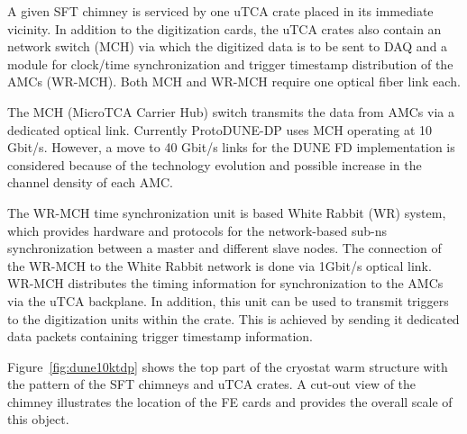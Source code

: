 
A given SFT chimney is serviced by one uTCA crate placed in its immediate vicinity. In addition to the digitization cards, the uTCA crates also contain an network switch (MCH) via which the digitized data is to be sent to DAQ and a module for clock/time synchronization and trigger timestamp distribution of the AMCs (WR-MCH). Both MCH and WR-MCH require one optical fiber link each. 

The MCH (MicroTCA Carrier Hub) switch transmits the data from AMCs via a dedicated optical link. Currently ProtoDUNE-DP uses MCH operating at 10 Gbit/s. However, a move to 40 Gbit/s links for the DUNE FD implementation is considered because of the technology evolution and possible increase in the channel density of each AMC.

The WR-MCH time synchronization unit is based White Rabbit (WR) system, which provides hardware and protocols for the network-based sub-ns synchronization between a master and different slave nodes. The connection of the WR-MCH to the White Rabbit network is done via \num{1}\si{Gbit/s} optical link. WR-MCH distributes the timing information for synchronization to the AMCs via the uTCA backplane. In addition, this unit can be used to transmit triggers to the digitization units within the crate. This is achieved by sending it dedicated data packets containing trigger timestamp information. 

Figure~\ref{fig:dune10ktdp} shows the top part of the cryostat warm structure with the pattern of the SFT chimneys and uTCA crates. A cut-out view of the chimney illustrates the location of the FE cards and provides the overall scale of this object. 


